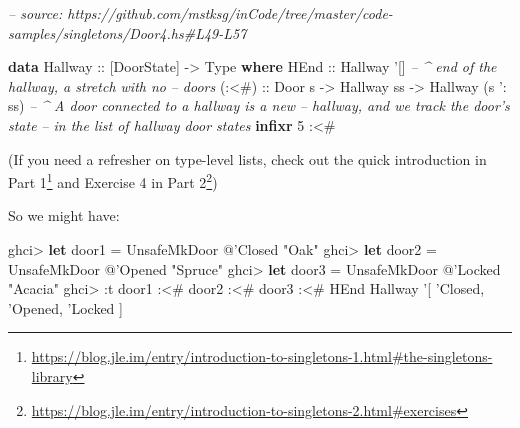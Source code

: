 \documentclass[]{article}
\newenvironment{Shaded}{}{}
\newcommand{\CommentTok}[1]{\textcolor[rgb]{0.38,0.63,0.69}{\textit{#1}}}
\newcommand{\DataTypeTok}[1]{\textcolor[rgb]{0.56,0.13,0.00}{#1}}
\newcommand{\DecValTok}[1]{\textcolor[rgb]{0.25,0.63,0.44}{#1}}
\newcommand{\FunctionTok}[1]{\textcolor[rgb]{0.02,0.16,0.49}{#1}}
\newcommand{\KeywordTok}[1]{\textcolor[rgb]{0.00,0.44,0.13}{\textbf{#1}}}
\newcommand{\NormalTok}[1]{#1}
\newcommand{\OtherTok}[1]{\textcolor[rgb]{0.00,0.44,0.13}{#1}}
\newcommand{\StringTok}[1]{\textcolor[rgb]{0.25,0.44,0.63}{#1}}
\renewcommand{\href}[2]{#2\footnote{\url{#1}}}
\begin{document}
\begin{Shaded}
\begin{Highlighting}[]
\CommentTok{-- source: https://github.com/mstksg/inCode/tree/master/code-samples/singletons/Door4.hs#L49-L57}

\KeywordTok{data} \DataTypeTok{Hallway}\OtherTok{ ::}\NormalTok{ [}\DataTypeTok{DoorState}\NormalTok{] }\OtherTok{->} \DataTypeTok{Type} \KeywordTok{where}
    \DataTypeTok{HEnd}\OtherTok{  ::} \DataTypeTok{Hallway}\NormalTok{ '[]        }\CommentTok{-- ^ end of the hallway, a stretch with no}
                                \CommentTok{--   doors}
\OtherTok{    (:<#) ::} \DataTypeTok{Door}\NormalTok{ s}
          \OtherTok{->} \DataTypeTok{Hallway}\NormalTok{ ss}
          \OtherTok{->} \DataTypeTok{Hallway}\NormalTok{ (s '}\FunctionTok{:}\NormalTok{ ss)  }\CommentTok{-- ^ A door connected to a hallway is a new}
                                \CommentTok{--   hallway, and we track the door's state}
                                \CommentTok{--   in the list of hallway door states}
\KeywordTok{infixr} \DecValTok{5} \FunctionTok{:<#}
\end{Highlighting}
\end{Shaded}

(If you need a refresher on type-level lists, check out
\href{https://blog.jle.im/entry/introduction-to-singletons-1.html\#the-singletons-library}{the
quick introduction in Part 1} and
\href{https://blog.jle.im/entry/introduction-to-singletons-2.html\#exercises}{Exercise
4 in Part 2})

So we might have:

\begin{Shaded}
\begin{Highlighting}[]
\NormalTok{ghci}\FunctionTok{>} \KeywordTok{let}\NormalTok{ door1 }\FunctionTok{=} \DataTypeTok{UnsafeMkDoor} \FunctionTok{@}\NormalTok{'}\DataTypeTok{Closed} \StringTok{"Oak"}
\NormalTok{ghci}\FunctionTok{>} \KeywordTok{let}\NormalTok{ door2 }\FunctionTok{=} \DataTypeTok{UnsafeMkDoor} \FunctionTok{@}\NormalTok{'}\DataTypeTok{Opened} \StringTok{"Spruce"}
\NormalTok{ghci}\FunctionTok{>} \KeywordTok{let}\NormalTok{ door3 }\FunctionTok{=} \DataTypeTok{UnsafeMkDoor} \FunctionTok{@}\NormalTok{'}\DataTypeTok{Locked} \StringTok{"Acacia"}
\NormalTok{ghci}\FunctionTok{>} \FunctionTok{:}\NormalTok{t door1 }\FunctionTok{:<#}\NormalTok{ door2 }\FunctionTok{:<#}\NormalTok{ door3 }\FunctionTok{:<#} \DataTypeTok{HEnd}
\DataTypeTok{Hallway}\NormalTok{ '[ '}\DataTypeTok{Closed}\NormalTok{, '}\DataTypeTok{Opened}\NormalTok{, '}\DataTypeTok{Locked}\NormalTok{ ]}
\end{Highlighting}
\end{Shaded}
\end{document}
